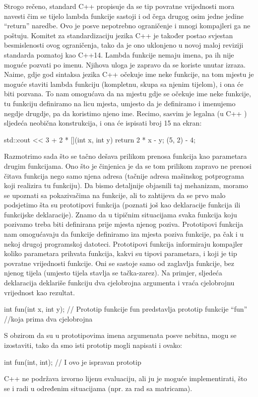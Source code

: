\documentclass[11pt]{book}
\begin{document}
Strogo rečeno, standard C++ propisuje da se tip povratne vrijednosti mora navesti čim
se tijelo lambda funkcije sastoji i od čega drugog osim jedne jedine “return” naredbe. Ovo je posve nepotrebno ograničenje i mnogi kompajleri ga ne poštuju. Komitet za standardizaciju jezika C++ je također postao svjestan besmislenosti ovog ograničenja,  tako da je ono uklonjeno u novoj maloj reviziji standarda poznatoj kao C++14. Lambda  funkcije  nemaju imena, pa ih nije moguće pozvati po imenu. Njihova uloga je zapravo da se koriste unutar izraza. Naime, gdje god sintaksa jezika C++ očekuje ime neke funkcije, na tom mjestu je moguće staviti lambda funkciju (kompletnu, skupa sa njenim tijelom), i ona će biti pozvana. To nam omogućava da na mjestu gdje se očekuje ime neke funkcije, tu funkciju definiramo na licu mjesta, umjesto da je definiramo i imenujemo negdje drugdje, pa da koristimo njeno ime. Recimo, sasvim je legalna (u C++ ) sljedeća neobična konstrukcija, i ona će ispisati broj 15 na ekran:

\begin{shortlisting}
  std::cout << 3 + 2 * [](int x, int y) { return 2 * x - y; } (5, 2) - 4;
\end{shortlisting}

Razmotrimo sada što se tačno dešava prilikom prenosa funkcija kao parametara drugim funkcijama. Ono što je činjenica je da se tom prilikom zapravo ne prenosi čitava funkcija nego samo njena adresa (tačnije adresa mašinskog potprograma koji realizira tu funkciju). Da bismo detaljnije objasnili taj mehanizam, moramo se upoznati sa pokazivačima na funkcije, ali to zahtijeva da se prvo malo podsjetimo šta su prototipovi funkcija (poznati još kao deklaracije funkcija ili funkcijske deklaracije). Znamo da u tipičnim situacijama svaka funkcija koju pozivamo treba biti definirana prije mjesta njenog poziva. Prototipovi funkcija nam omogućavaju da funkcije definiramo iza mjesta poziva funkcije, pa čak i u nekoj drugoj programskoj datoteci. Prototipovi funkcija informiraju kompajler koliko parametara prihvata funkcija, kakvi su tipovi parametara, i koji je tip povratne vrijednosti funkcije. Oni se sastoje samo od zaglavlja funkcije, bez njenog tijela (umjesto tijela stavlja se tačka-zarez). Na primjer, sljedeća deklaracija deklariše funkciju dva cjelobrojna argumenta i vraća cjelobrojnu vrijednost kao rezultat.
\begin{shortlisting}
  int fun(int x, int y);
  //  Prototip  funkcije  fun  predstavlja  prototip  funkcije  “fun”
  //koja  prima  dva  cjelobrojna
\end{shortlisting}
S obzirom da su u prototipovima imena argumenata posve nebitna, mogu se izostaviti, tako da smo isti prototip mogli napisati i ovako:
\begin{shortlisting}
  int fun(int, int); // I ovo je ispravan prototip
\end{shortlisting}
C++ ne podržava izvorno lijenu evaluaciju, ali ju je moguće implementirati, što se i radi u određenim situacijama (npr. za rad sa matricama).
\end{document}
